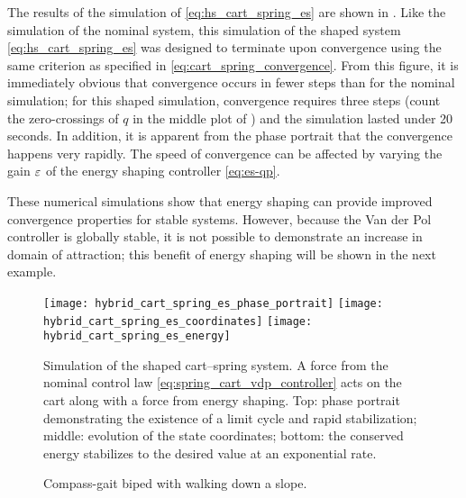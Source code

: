The results of the simulation of \eqref{eq:hs_cart_spring_es} are shown in
.
% 
Like the simulation of the nominal system, this simulation of the shaped system
\eqref{eq:hs_cart_spring_es} was designed to terminate upon convergence using
the same criterion as specified in \eqref{eq:cart_spring_convergence}.
% 
From this figure, it is immediately obvious that convergence occurs in fewer
steps than for the nominal simulation;
% 
for this shaped simulation, convergence requires three steps (count the
zero-crossings of $q$ in the middle plot of
) and the simulation lasted under 20
seconds.
% 
In addition, it is apparent from the phase portrait that the convergence happens
very rapidly.
% 
The speed of convergence can be affected by varying the gain $\varepsilon$ of
the energy shaping controller \eqref{eq:es-qp}.

These numerical simulations show that energy shaping can provide improved
convergence properties for stable systems.
% 
However, because the Van der Pol controller is globally stable, it is not
possible to demonstrate an increase in domain of attraction;
% 
this benefit of energy shaping will be shown in the next example.


\begin{figure*}[htp!]
  \centering
  \texttt{[image: hybrid\_cart\_spring\_es\_phase\_portrait]}
  \texttt{[image: hybrid\_cart\_spring\_es\_coordinates]}
  \texttt{[image: hybrid\_cart\_spring\_es\_energy]}
  \caption[Simulation of the shaped cart--spring system.]{Simulation of the
    shaped cart--spring system.
    A force from the nominal control law \eqref{eq:spring_cart_vdp_controller}
    acts on the cart along with a force from energy shaping.
    Top: phase portrait demonstrating the existence of a limit cycle and rapid
    stabilization;
    middle: evolution of the state coordinates;
    bottom: the conserved energy stabilizes to the desired value at an
    exponential rate.}
  \label{fig:cart_spring_simulation_shaped}
\end{figure*}


\begin{figure}
  \centering
  \def\svgwidth{0.5\columnwidth}
  
  \caption{Compass-gait biped with walking down a slope.}
  \label{fig:simulation-model}
  \vspace{-1em}
\end{figure}

